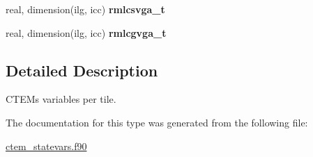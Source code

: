 \begin{DoxyCompactItemize}
\item 
\hypertarget{structctem__statevars_1_1ctem__tile__level_a5ffc637f55e57a3b600df1bd21794ad1}{}real, dimension(ilg, icc) {\bfseries rmlcsvga\+\_\+t}\label{structctem__statevars_1_1ctem__tile__level_a5ffc637f55e57a3b600df1bd21794ad1}

\item 
\hypertarget{structctem__statevars_1_1ctem__tile__level_ad71adfbf5bb76a25209cfe256ca52a79}{}real, dimension(ilg, icc) {\bfseries rmlcgvga\+\_\+t}\label{structctem__statevars_1_1ctem__tile__level_ad71adfbf5bb76a25209cfe256ca52a79}

\end{DoxyCompactItemize}


\subsection{Detailed Description}
C\+T\+E\+M\textquotesingle{}s variables per tile. 

The documentation for this type was generated from the following file\+:\begin{DoxyCompactItemize}
\item 
\hyperlink{ctem__statevars_8f90}{ctem\+\_\+statevars.\+f90}\end{DoxyCompactItemize}
